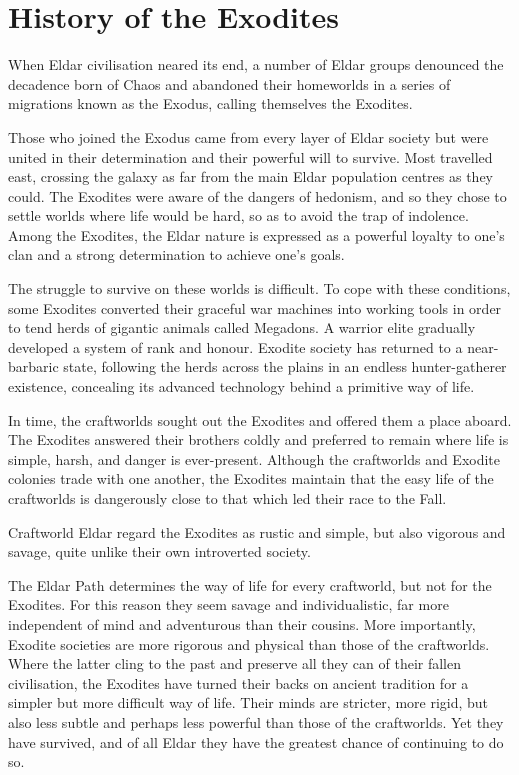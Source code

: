 \section{History of the Exodites}

When Eldar civilisation neared its end, a number of Eldar groups denounced the decadence born of Chaos and abandoned their homeworlds in a series of migrations known as the Exodus, calling themselves the Exodites.

Those who joined the Exodus came from every layer of Eldar society but were united in their determination and their powerful will to survive. Most travelled east, crossing the galaxy as far from the main Eldar population centres as they could. The Exodites were aware of the dangers of hedonism, and so they chose to settle worlds where life would be hard, so as to avoid the trap of indolence. Among the Exodites, the Eldar nature is expressed as a powerful loyalty to one's clan and a strong determination to achieve one's goals.

The struggle to survive on these worlds is difficult. To cope with these conditions, some Exodites converted their graceful war machines into working tools in order to tend herds of gigantic animals called Megadons. A warrior elite gradually developed a system of rank and honour. Exodite society has returned to a near-barbaric state, following the herds across the plains in an endless hunter-gatherer existence, concealing its advanced technology behind a primitive way of life.

In time, the craftworlds sought out the Exodites and offered them a place aboard. The Exodites answered their brothers coldly and preferred to remain where life is simple, harsh, and danger is ever-present. Although the craftworlds and Exodite colonies trade with one another, the Exodites maintain that the easy life of the craftworlds is dangerously close to that which led their race to the Fall.

Craftworld Eldar regard the Exodites as rustic and simple, but also vigorous and savage, quite unlike their own introverted society.

The Eldar Path determines the way of life for every craftworld, but not for the Exodites. For this reason they seem savage and individualistic, far more independent of mind and adventurous than their cousins. More importantly, Exodite societies are more rigorous and physical than those of the craftworlds. Where the latter cling to the past and preserve all they can of their fallen civilisation, the Exodites have turned their backs on ancient tradition for a simpler but more difficult way of life. Their minds are stricter, more rigid, but also less subtle and perhaps less powerful than those of the craftworlds. Yet they have survived, and of all Eldar they have the greatest chance of continuing to do so.
